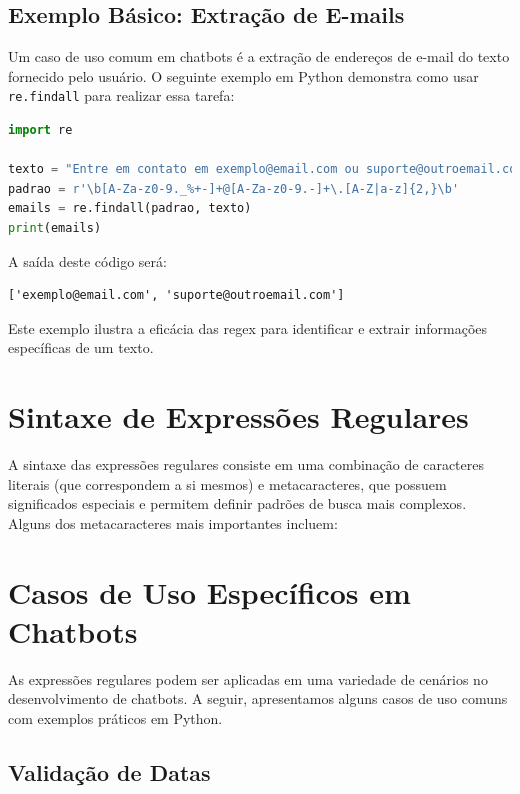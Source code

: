 \documentclass[14pt,a4paper,oneside]{book}
\begin{document}
\subsection{Exemplo Básico: Extração de E-mails}

Um caso de uso comum em chatbots é a extração de endereços de e-mail do texto fornecido pelo usuário. O seguinte exemplo em Python demonstra como usar \texttt{re.findall} para realizar essa tarefa:

\begin{lstlisting}[language=Python, caption=Extração de e-mails com regex, label=lst:extracao_email]
import re

texto = "Entre em contato em exemplo@email.com ou suporte@outroemail.com."
padrao = r'\b[A-Za-z0-9._%+-]+@[A-Za-z0-9.-]+\.[A-Z|a-z]{2,}\b'
emails = re.findall(padrao, texto)
print(emails)
\end{lstlisting}

A saída deste código será:

\begin{verbatim}
['exemplo@email.com', 'suporte@outroemail.com']
\end{verbatim}

Este exemplo ilustra a eficácia das regex para identificar e extrair informações específicas de um texto.

\section{Sintaxe de Expressões Regulares}

A sintaxe das expressões regulares consiste em uma combinação de caracteres literais (que correspondem a si mesmos) e metacaracteres, que possuem significados especiais e permitem definir padrões de busca mais complexos. Alguns dos metacaracteres mais importantes incluem:


\section{Casos de Uso Específicos em Chatbots}

As expressões regulares podem ser aplicadas em uma variedade de cenários no desenvolvimento de chatbots. A seguir, apresentamos alguns casos de uso comuns com exemplos práticos em Python.

\subsection{Validação de Datas}
\end{document}
